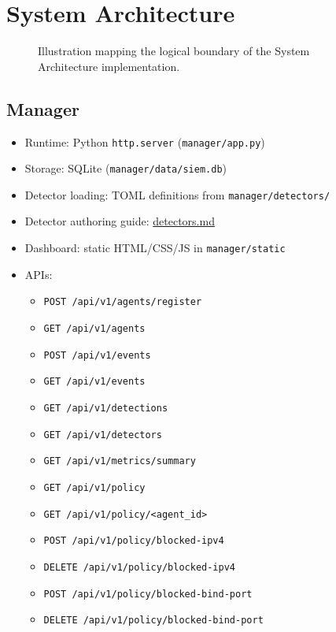 \documentclass[
  12pt,
]{report}
\providecommand{\tightlist}{%
  \setlength{\itemsep}{0pt}\setlength{\parskip}{0pt}}
\begin{document}
\chapter{System Architecture}\label{system-architecture}

\begin{figure}[h]
\centering
\vspace{5cm}
\caption{Illustration mapping the logical boundary of the System Architecture implementation.}
\end{figure}

\section{Manager}\label{manager}

\begin{itemize}
\tightlist
\item
  Runtime: Python \texttt{http.server} (\texttt{manager/app.py})
\item
  Storage: SQLite (\texttt{manager/data/siem.db})
\item
  Detector loading: TOML definitions from \texttt{manager/detectors/}
\item
  Detector authoring guide: \url{detectors.md}
\item
  Dashboard: static HTML/CSS/JS in \texttt{manager/static}
\item
  APIs:

  \begin{itemize}
  \tightlist
  \item
    \texttt{POST\ /api/v1/agents/register}
  \item
    \texttt{GET\ /api/v1/agents}
  \item
    \texttt{POST\ /api/v1/events}
  \item
    \texttt{GET\ /api/v1/events}
  \item
    \texttt{GET\ /api/v1/detections}
  \item
    \texttt{GET\ /api/v1/detectors}
  \item
    \texttt{GET\ /api/v1/metrics/summary}
  \item
    \texttt{GET\ /api/v1/policy}
  \item
    \texttt{GET\ /api/v1/policy/\textless{}agent\_id\textgreater{}}
  \item
    \texttt{POST\ /api/v1/policy/blocked-ipv4}
  \item
    \texttt{DELETE\ /api/v1/policy/blocked-ipv4}
  \item
    \texttt{POST\ /api/v1/policy/blocked-bind-port}
  \item
    \texttt{DELETE\ /api/v1/policy/blocked-bind-port}
  \end{itemize}
\end{itemize}
\end{document}
